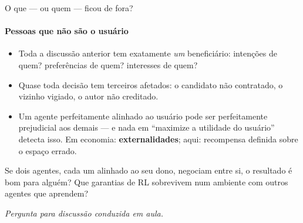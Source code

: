\documentclass[aspectratio=169, 11pt]{beamer}
\newcommand{\paradiscussao}{\smallskip
  {\footnotesize\color{rlCinza}\itshape Pergunta para discussão conduzida em aula.}}
\begin{document}
\begin{frame}{O que --- ou quem --- ficou de fora?}
  \framesubtitle{Pessoas que não são o usuário}
  {\small
  \begin{itemize}\setlength{\itemsep}{0.25ex}
    \item Toda a discussão anterior tem exatamente \emph{um} beneficiário:
          intenções de quem? preferências de quem? interesses de quem?
    \item Quase toda decisão tem terceiros afetados: o candidato não
          contratado, o vizinho vigiado, o autor não creditado.
    \item Um agente perfeitamente alinhado ao usuário pode ser
          \alert{perfeitamente prejudicial} aos demais --- e nada em
          ``maximize a utilidade do usuário'' detecta isso. Em economia:
          \textbf{externalidades}; aqui: recompensa definida sobre o espaço
          errado.
  \end{itemize}}

  \vspace{-0.5em}
  \begin{quizbox}{}
    Se dois agentes, cada um alinhado ao seu dono, negociam entre si, o
    resultado é bom para alguém? Que garantias de RL sobrevivem num ambiente
    com outros agentes que aprendem?
  \end{quizbox}
  \paradiscussao
\end{frame}
\end{document}
